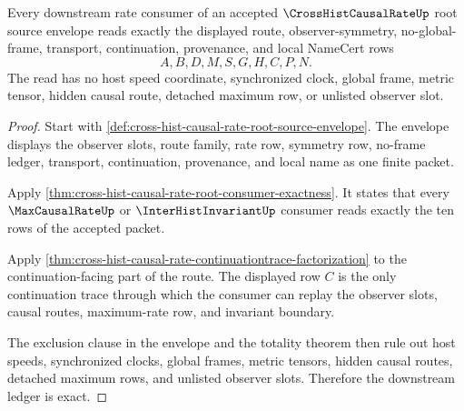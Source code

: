 \begin{theorem}
\label{thm:cross-hist-causal-rate-root-ledger-exactness}
Every downstream rate consumer of an accepted $\CrossHistCausalRateUp$ root
source envelope reads exactly the displayed route, observer-symmetry,
no-global-frame, transport, continuation, provenance, and local NameCert rows
$$
A,B,D,M,S,G,H,C,P,N.
$$
The read has no host speed coordinate, synchronized clock, global frame,
metric tensor, hidden causal route, detached maximum row, or unlisted observer
slot.
\end{theorem}
\begin{proof}
Start with \autoref{def:cross-hist-causal-rate-root-source-envelope}. The
envelope displays the observer slots, route family, rate row, symmetry row,
no-frame ledger, transport, continuation, provenance, and local name as one
finite packet.

Apply \autoref{thm:cross-hist-causal-rate-root-consumer-exactness}. It states
that every $\MaxCausalRateUp$ or $\InterHistInvariantUp$ consumer reads exactly
the ten rows of the accepted packet.

Apply \autoref{thm:cross-hist-causal-rate-continuationtrace-factorization} to
the continuation-facing part of the route. The displayed row $C$ is the only
continuation trace through which the consumer can replay the observer slots,
causal routes, maximum-rate row, and invariant boundary.

The exclusion clause in the envelope and the totality theorem then rule out
host speeds, synchronized clocks, global frames, metric tensors, hidden
causal routes, detached maximum rows, and unlisted observer slots. Therefore
the downstream ledger is exact.
\end{proof}

